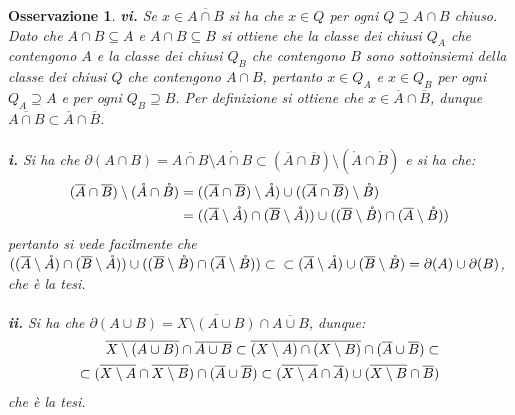 \documentclass[oneside, 11pt]{amsbook}
\makeatletter
\newcommand{\0}{{(0)}}
\newcommand{\3}{{(3)}}
\theoremstyle{colonplain}
\theoremstyle{colondefinition}
\theoremstyle{colonremark}
\newtheorem{rmk}[thm]{Osservazione}
\numberwithin{equation}{chapter}
\renewcommand{\proofname}{Dimostrazione}
\renewenvironment{proof}[1][\proofname]{\par
  \pushQED{\end{proof}}%
  \normalfont \topsep6\p@\@plus6\p@\relax
  \trivlist
  \item[\hskip\labelsep\bfseries #1:]\ignorespaces
}{%
  \popQED\endtrivlist\@endpefalse
}
\makeatother
\begin{document}
\begin{rmk}
\begin{proof}
\textbf{vi.} Se $x \in \overline{A \cap B}$ si ha che $x \in Q$ per ogni $Q \supseteq A \cap B$ chiuso. Dato che $A \cap B \subseteq A$ e $A \cap B \subseteq B$ si ottiene che la classe dei chiusi $Q_A$ che contengono $A$ e la classe dei chiusi $Q_B$ che contengono $B$ sono sottoinsiemi della classe dei chiusi $Q$ che contengono $A \cap B$, pertanto $x \in Q_A$ e $x \in Q_B$ per ogni $Q_A \supseteq A$ e per ogni $Q_B \supseteq B$. Per definizione si ottiene che $x \in \overline{A} \cap \overline{B}$, dunque $\overline{A \cap B} \subset \overline{A} \cap \overline{B}$. \\ \\
\textbf{i.} Si ha che $\partial (A \cap B) = \overline{A \cap B} \setminus \mathring{A \cap B} \subset (\overline{A} \cap \overline{B}) \setminus (\mathring{A} \cap \mathring{B})$ e si ha che:
\begin{align}
    (\overline{A} \cap \overline{B}) \setminus (\mathring{A} \cap \mathring{B}) &= ((\overline{A} \cap \overline{B}) \setminus \mathring{A}) \cup ((\overline{A} \cap \overline{B}) \setminus \mathring{B}) \notag \\
    &= ((\overline{A} \setminus \mathring{A}) \cap (\overline{B} \setminus \mathring{A})) \cup ((\overline{B} \setminus \mathring{B}) \cap (\overline{A} \setminus \mathring{B})) \notag
\end{align}
pertanto si vede facilmente che $((\overline{A} \setminus \mathring{A}) \cap (\overline{B} \setminus \mathring{A})) \cup ((\overline{B} \setminus \mathring{B}) \cap (\overline{A} \setminus \mathring{B})) \subset\\\subset (\overline{A} \setminus \mathring{A}) \cup (\overline{B} \setminus \mathring{B}) = \partial (A) \cup \partial (B)$, che è la tesi. \\ \\
\textbf{ii.} Si ha che $\partial (A \cup B) = \overline{X \setminus (A \cup B)} \cap \overline{A \cup B}$, dunque:
\begin{align}
    \overline{X \setminus (A \cup B)} \cap \overline{A \cup B} \subset \overline{(X \setminus A) \cap (X \setminus B)} \cap (\overline{A} \cup \overline{B}) \subset \notag \\
    \subset (\overline{X \setminus A} \cap \overline{X \setminus B}) \cap (\overline{A} \cup \overline{B}) \subset (\overline{X \setminus A} \cap \overline{A}) \cup (\overline{X \setminus B} \cap \overline{B}) \notag
\end{align}
che è la tesi.
\end{proof}


\end{rmk}
\end{document}
